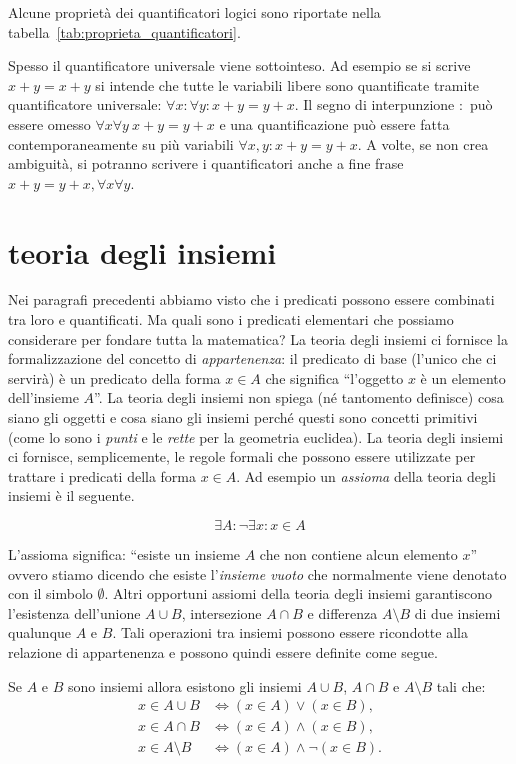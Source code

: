Alcune proprietà dei quantificatori logici sono riportate
nella tabella~\ref{tab:proprieta_quantificatori}.

Spesso il quantificatore universale viene sottointeso.
Ad esempio se si scrive $x+y=x+y$
si intende che tutte le variabili libere sono quantificate 
tramite quantificatore universale: 
$\forall x\colon \forall y\colon x+y=y+x$.
Il segno di interpunzione $\colon$ può essere omesso
$\forall x \forall y\ x+y=y+x$
e una quantificazione può essere fatta contemporaneamente 
su più variabili $\forall x,y\colon x+y = y+x$.
A volte, se non crea ambiguità, si potranno scrivere 
i quantificatori anche a fine frase $x+y=y+x, \forall x\forall y$.

\section{teoria degli insiemi}

Nei paragrafi precedenti abbiamo visto che i predicati possono essere
combinati tra loro e quantificati.
Ma quali sono i predicati elementari che possiamo considerare per fondare 
tutta la matematica?
La teoria degli insiemi ci fornisce la formalizzazione del concetto
di \emph{appartenenza}: il predicato di base (l'unico che ci servirà) è
un predicato della forma $x \in A$ che significa ``l'oggetto $x$ è un elemento
dell'insieme $A$''.
La teoria degli insiemi non spiega (né tantomento definisce)
cosa siano gli oggetti e cosa siano gli insiemi perché questi sono concetti
primitivi (come lo sono i \emph{punti} e le \emph{rette} per la geometria euclidea).
La teoria degli insiemi ci fornisce, semplicemente, le regole formali che
possono essere utilizzate per trattare i predicati della forma $x\in A$.
Ad esempio un \emph{assioma} 
della teoria degli insiemi è il seguente.
\begin{axiom}
\[
  \exists A \colon \lnot \exists x\colon x \in A
\]
\end{axiom}
L'assioma significa: ``esiste un insieme $A$ che non contiene alcun elemento $x$''
ovvero stiamo dicendo che esiste l'\emph{insieme vuoto}%
%
 che normalmente viene
denotato con il simbolo $\emptyset$.
Altri opportuni assiomi della teoria degli insiemi garantiscono l'esistenza
dell'unione $A\cup B$, intersezione $A\cap B$ e differenza $A\setminus B$
di due insiemi qualunque $A$ e $B$. Tali operazioni
tra insiemi possono essere ricondotte alla relazione di appartenenza
e possono quindi essere definite come segue.
\begin{axiom}
Se $A$ e $B$ sono insiemi allora esistono gli insiemi  
$A\cup B$, $A\cap B$ e $A\setminus B$ tali che:
\begin{align*}
    x \in A \cup B &\iff (x\in A) \lor (x\in B),\\
    x \in A \cap B &\iff (x\in A) \land (x\in B),\\
    x \in A \setminus B &\iff (x\in A) \land \lnot (x \in B).
\end{align*}
\end{axiom}

